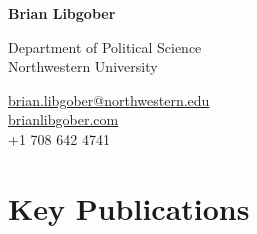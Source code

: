\documentclass[12pt,letterpaper]{report}
\newcommand{\myname}{Brian Libgober}
\newcommand{\namefont}[1]{{\normalfont\bfseries\Huge{#1}}}
\begin{document}
	\pagestyle{fancy}
	\fancyhf{}
	\renewcommand{\headrulewidth}{0pt}
    \raggedright{}

    \begin{minipage}[t]{0.6\textwidth}
	\raggedright{}
    \namefont{\myname}
	\end{minipage}
	\hfill
    \vspace{1em}
    \begin{minipage}[t]{0.6\textwidth}
        \flushleft{} Department of Political Science \\
         Northwestern University
    \end{minipage}
    \hfill
    \begin{minipage}[t]{0.395\textwidth}
        \flushright{}
        \href{mailto:brian.libgober@northwestern.edu}{brian.libgober@northwestern.edu} \\
        \href{https://brianlibgober.com}{brianlibgober.com} \\
         +1 708 642 4741 \\
    \end{minipage}
    



\section*{Key Publications}  

\begin{tablist}[labelsep=0em]

\item[] 

\item[] 

\item[] 
\item[] 

\item[] 

\end{tablist}
\end{document}
